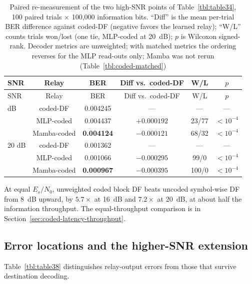 \begin{longtable}[]{@{}lccccc@{}}
\caption[Paired re-measurement of the high-SNR points]{Paired re-measurement of the two high-SNR points of Table~\ref{tbl:table34}, 100 paired trials $\times$ 100{,}000 information bits. ``Diff'' is the mean per-trial BER difference against coded-DF (negative favors the learned relay); ``W/L'' counts trials won/lost (one tie, MLP-coded at 20~dB); $p$ is Wilcoxon signed-rank. Decoder metrics are unweighted; with matched metrics the ordering reverses for the MLP read-outs only; Mamba was not rerun (Table~\ref{tbl:coded-matched})}\label{tbl:table37}\tabularnewline
\toprule\noalign{}
SNR & Relay & BER & Diff vs.\ coded-DF & W/L & $p$ \\
\midrule\noalign{}
\endfirsthead
\toprule\noalign{}
SNR & Relay & BER & Diff vs.\ coded-DF & W/L & $p$ \\
\midrule\noalign{}
\endhead
\bottomrule\noalign{}
\endlastfoot
16 dB & coded-DF & 0.004245 & --- & --- & --- \\
 & MLP-coded & 0.004437 & $+0.000192$ & 23/77 & $<10^{-4}$ \\
 & Mamba-coded & \textbf{0.004124} & $-0.000121$ & 68/32 & $<10^{-4}$ \\
\hline
20 dB & coded-DF & 0.001362 & --- & --- & --- \\
 & MLP-coded & 0.001066 & $-0.000295$ & 99/0 & $<10^{-4}$ \\
 & Mamba-coded & \textbf{0.000967} & $-0.000395$ & 100/0 & $<10^{-4}$ \\
\end{longtable}

At equal $E_s/N_0$, unweighted coded block DF beats uncoded symbol-wise DF from 8~dB upward, by $5.7\times$ at 16~dB and $7.2\times$ at 20~dB, at about half the information throughput. The equal-throughput comparison is in Section~\ref{sec:coded-latency-throughput}.

\subsection{Error locations and the higher-SNR extension}

Table~\ref{tbl:table38} distinguishes relay-output errors from those that survive destination decoding.

